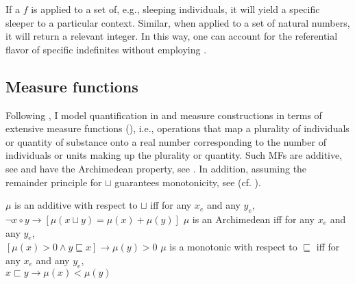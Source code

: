 \documentclass[output=paper, newtxmath, colorlinks, citecolor=brown]{langsci/langscibook}
\begin{document}
\noindent If a  $f$ is applied to a set of, e.g., sleeping individuals, it will yield a specific sleeper  to a particular context. Similar, when applied to a set of natural numbers, it will return a relevant integer. In this way, one can account for the referential flavor of specific indefinites without employing .

	\subsection{Measure functions}\label{sec:measure-functions}

    \largerpage[2]
	Following \cite{krifka1989nominal}, I model quantification in  and measure constructions in terms of extensive measure functions (), i.e., operations that map a plurality of individuals or quantity of substance onto a real number corresponding to the number of individuals or units making up the plurality or quantity. Such MFs are additive, see  and have the Archimedean property, see . In addition, assuming the remainder principle for $\sqcup$ guarantees monotonicity, see  (cf. \citealt{schwarzschild2002grammar}).

	\ea \ea $\mu$ is an additive  with respect to $\sqcup$ iff for any $x_e$ and any $y_e$,\\$\neg x \circ y \rightarrow [\mu(x\sqcup y) = \mu(x) + \mu(y)]$\label{ex:mf-additive}
	\ex $\mu$ is an Archimedean  iff for any $x_e$ and any $y_e$,\\$[\mu(x) > 0 \wedge y \sqsubseteq x] \rightarrow \mu(y) > 0$\label{ex:mf-archimedean}
	\ex $\mu$ is a monotonic  with respect to $\sqsubseteq$ iff for any $x_e$ and any $y_e$,\\$x \sqsubset y \rightarrow \mu(x) < \mu(y)$\label{ex:mf-monotonic}
	\z
    \z


\end{document}

